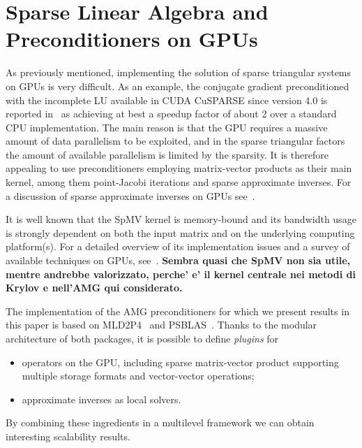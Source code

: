 \section{Sparse Linear Algebra and Preconditioners on GPUs\label{SLA-GPU}}


As previously mentioned, implementing the
solution of sparse triangular systems on GPUs is very difficult.
As an example, the conjugate gradient preconditioned with the incomplete
LU available in CUDA CuSPARSE since version 4.0 
is reported in~\cite{Naumov11} as achieving at best a speedup factor
of about 2 over a standard CPU implementation. The main reason is that
the GPU requires a massive amount of data parallelism to be exploited,
and in the sparse triangular factors the amount of available
parallelism is limited by the sparsity. It is therefore appealing to
use preconditioners employing matrix-vector products as their main
kernel, among them point-Jacobi iterations and sparse approximate inverses.
For a discussion of sparse approximate inverses on GPUs 
see~\cite{BERTACCINI2016693}. 

It is well known that the SpMV kernel is memory-bound
and  its bandwidth usage  is strongly dependent on both the input
matrix and on the underlying computing platform(s). For a detailed
overview of its implementation issues and a survey of available
techniques on GPUs, see~\cite{Filippone:2017:SMM:3034774.3017994}.
\textbf{Sembra quasi che SpMV non sia utile, mentre andrebbe valorizzato, perche' e'
il kernel centrale nei metodi di Krylov e nell'AMG qui considerato.}

The implementation of the AMG preconditioners for which we 
present results in this paper is based on MLD2P4~\cite{mld-toms} and
PSBLAS~\cite{psblas3}. Thanks to the modular architecture of both
packages, it is possible to define \emph{plugins} for 
\begin{itemize}
\item operators on the GPU, including sparse matrix-vector product
  supporting multiple storage formats and vector-vector operations;
\item approximate inverses as local solvers.
\end{itemize}
By combining these ingredients in a multilevel framework we can obtain
interesting scalability results. 

